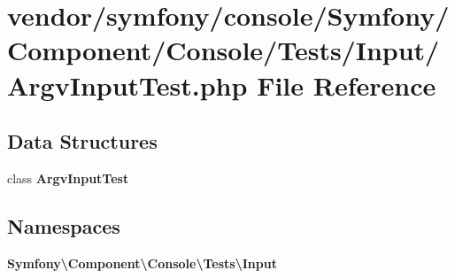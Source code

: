 \section{vendor/symfony/console/\+Symfony/\+Component/\+Console/\+Tests/\+Input/\+Argv\+Input\+Test.php File Reference}
\label{_argv_input_test_8php}
\subsection*{Data Structures}
\begin{DoxyCompactItemize}
\item 
class {\bf Argv\+Input\+Test}
\end{DoxyCompactItemize}
\subsection*{Namespaces}
\begin{DoxyCompactItemize}
\item 
 {\bf Symfony\textbackslash{}\+Component\textbackslash{}\+Console\textbackslash{}\+Tests\textbackslash{}\+Input}
\end{DoxyCompactItemize}
